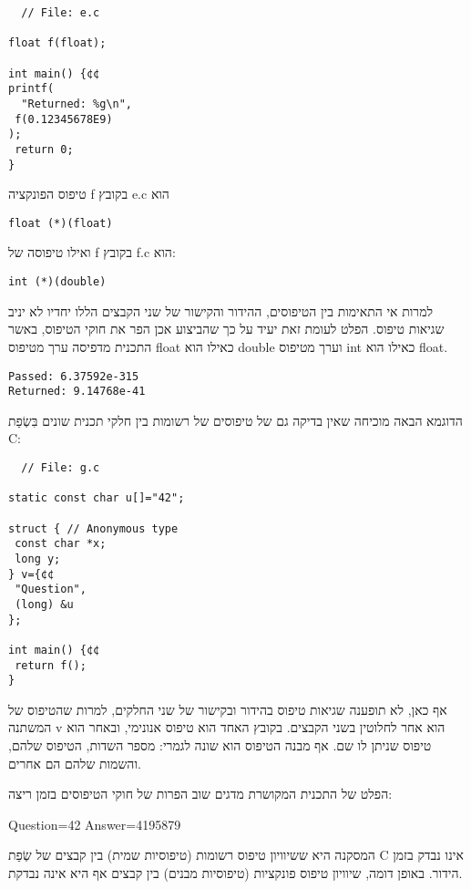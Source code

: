 \begin{טבלא}[!htbp]
\begin{verbatim}
  // File: e.c

float f(float);

int main() {¢¢
printf(
  "Returned: %g\n",
 f(0.12345678E9)
);
 return 0;
}

\end{verbatim}

      טיפוס הפונקציה f בקובץ e.c הוא

\begin{verbatim}
float (*)(float)
\end{verbatim}

      ואילו טיפוסה של f בקובץ f.c הוא:
\begin{verbatim}
int (*)(double)
\end{verbatim}

      למרות אי התאימות בין הטיפוסים, ההידור והקישור של שני הקבצים הללו יחדיו לא יניב
      שגיאות טיפוס. הפלט לעומת זאת יעיד על כך שהביצוע אכן הפר את חוקי הטיפוס, באשר
      התכנית מדפיסה ערך מטיפוס float כאילו הוא double וערך מטיפוס int כאילו הוא
      float.

\begin{verbatim}
Passed: 6.37592e-315
Returned: 9.14768e-41
\end{verbatim}

      הדוגמא הבאה מוכיחה שאין בדיקה גם של טיפוסים של רשומות בין חלקי תכנית שונים בִּשְׂפַת C:

\begin{verbatim}
  // File: g.c

static const char u[]="42";

struct { // Anonymous type
 const char *x;
 long y;
} v={¢¢
 "Question",
 (long) &u
};

int main() {¢¢
 return f();
}
\end{verbatim}

      אף כאן, לא תופענה שגיאות טיפוס בהידור ובקישור של שני החלקים, למרות שהטיפוס של המשתנה v הוא אחר לחלוטין בשני הקבצים. בקובץ האחד הוא טיפוס אנונימי, ובאחר הוא טיפוס שניתן לו שם. אף מבנה הטיפוס הוא שונה לגמרי: מספר השדות, הטיפוס שלהם, והשמות שלהם הם אחרים.

      הפלט של התכנית המקושרת מדגים שוב הפרות של חוקי הטיפוסים בזמן ריצה:

      Question=42
      Answer=4195879

      המסקנה היא ששיוויון טיפוס רשומות (טיפוסיות שמית) בין קבצים של שְׂפַת C אינו נבדק בזמן הידור. באופן דומה, שיוויון טיפוס פונקציות (טיפוסיות מבנים) בין קבצים אף היא אינה נבדקת.


\end{טבלא}
